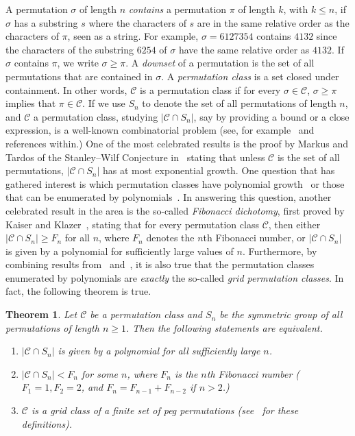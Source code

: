 \documentclass{article}
\numberwithin{equation}{section}
\newtheorem{thm}{Theorem}[section]
\theoremstyle{definition}
\begin{document}
A permutation $\sigma$ of length $n$ \emph{contains} a permutation $\pi$ of length $k$, with $k\leq n$, if $\sigma$ has a substring $s$ where the characters of $s$ are in the same relative order as the characters of $\pi$, seen as a string. For example, $\sigma=6127354$ contains $4132$ since the characters of the substring $6254$ of $\sigma$ have the same relative order as $4132$. If $\sigma$ contains $\pi$, we write $\sigma\geq\pi$. A \emph{downset} of a permutation is the set of all permutations that are contained in $\sigma.$ A \emph{permutation class} is a set closed under containment. In other words, $\mathcal{C}$ is a permutation class if for every $\sigma\in \mathcal{C}$, $\sigma\geq\pi$ implies that $\pi\in\mathcal{C}.$ If we use $S_n$ to denote the set of all permutations of length $n$, and $\mathcal{C}$ a permutation class, studying  $|\mathcal{C}\cap S_n|$, say by providing a bound or a close expression, is a well-known combinatorial problem (see, for example~\cite{HV16,HV06,KK02, V15} and references within.) One of the most celebrated results is the proof by Markus and Tardos of the Stanley--Wilf Conjecture in~\cite{MT04} stating that unless $\mathcal{C}$ is the set of all permutations, $|\mathcal{C}\cap S_n|$ has at most exponential growth. One question that has gathered interest is which permutation classes have polynomial growth~\cite{AAB06} or those that can be enumerated by polynomials~\cite{KK02, HV06, HV16}. In answering this question, another celebrated result in the area is the so-called \emph{Fibonacci dichotomy}, first proved by Kaiser and Klazer~\cite{KK02}, stating that for every permutation class $\mathcal{C}$, then either $|\mathcal{C}\cap S_n|\geq F_n$ for all $n$, where $F_n$ denotes the $n$th Fibonacci number, or $|\mathcal{C}\cap S_n|$ is given by a polynomial for sufficiently large values of $n$. Furthermore, by combining results from~\cite{AAB06} and~\cite{HV06}, it is also true that the permutation classes enumerated by polynomials are \emph{exactly} the so-called \emph{grid permutation classes}. In fact, the following theorem is true.

\begin{thm}\cite[Theorem 1.3]{HV16}\label{thm:HVA}
Let $\mathcal{C}$ be a permutation class and $S_n$ be the symmetric group of all permutations of length $n\geq1$. Then the following statements are equivalent.
\begin{enumerate}
    \item[(a)] $|\mathcal{C}\cap S_n|$ is given by a polynomial for all sufficiently large $n$.
    \item[(b)] $|\mathcal{C}\cap S_n|<F_n$ for some $n$, where $F_n$ is the $n$th Fibonacci number ($F_1=1,F_2=2$, and $F_n=F_{n-1}+F_{n-2}$ if $n>2$.)
    \item[(c)] $\mathcal{C}$ is a \emph{grid class} of a finite set of \emph{peg permutations} (see~\cite{HV16} for these definitions).
\end{enumerate}
\end{thm}
\end{document}
